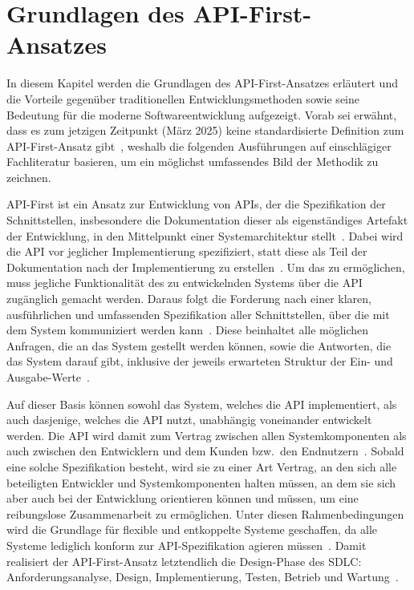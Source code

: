 \chapter{Grundlagen des API-First-Ansatzes}
In diesem Kapitel werden die Grundlagen des API-First-Ansatzes erläutert und die Vorteile gegenüber traditionellen Entwicklungsmethoden sowie seine Bedeutung für die moderne Softwareentwicklung aufgezeigt.
Vorab sei erwähnt, dass es zum jetzigen Zeitpunkt (März 2025) keine standardisierte Definition zum API-First-Ansatz gibt~\autocite[77]{bea22}, weshalb die folgenden Ausführungen auf einschlägiger Fachliteratur basieren, um ein möglichst umfassendes Bild der Methodik zu zeichnen.

API-First ist ein Ansatz zur Entwicklung von \acp{API}, der die Spezifikation der Schnittstellen, insbesondere die Dokumentation dieser als eigenständiges Artefakt der Entwicklung, in den Mittelpunkt einer Systemarchitektur stellt~\autocite[2]{kul23}.
Dabei wird die \ac{API} vor jeglicher Implementierung spezifiziert, statt diese als Teil der Dokumentation nach der Implementierung zu erstellen~\autocites[1627]{cha21}[349]{de23}.
Um das zu ermöglichen, muss jegliche Funktionalität des zu entwickelnden Systems über die \ac{API} zugänglich gemacht werden.
Daraus folgt die Forderung nach einer klaren, ausführlichen und umfassenden Spezifikation aller Schnittstellen, über die mit dem System kommuniziert werden kann~\autocite[75]{bea22}.
Diese beinhaltet alle möglichen Anfragen, die an das System gestellt werden können, sowie die Antworten, die das System darauf gibt, inklusive der jeweils erwarteten Struktur der Ein- und Ausgabe-Werte~\autocite[350]{de23}.

Auf dieser Basis können sowohl das System, welches die \ac{API} implementiert, als auch dasjenige, welches die \ac{API} nutzt, unabhängig voneinander entwickelt werden.
Die \ac{API} wird damit zum Vertrag zwischen allen Systemkomponenten als auch zwischen den Entwicklern und dem Kunden bzw.\ den Endnutzern~\autocite[1627]{cha21}.
Sobald eine solche Spezifikation besteht, wird sie zu einer Art Vertrag, an den sich alle beteiligten Entwickler und Systemkomponenten halten müssen, an dem sie sich aber auch bei der Entwicklung orientieren können und müssen, um eine reibungslose Zusammenarbeit zu ermöglichen.
Unter diesen Rahmenbedingungen wird die Grundlage für flexible und entkoppelte Systeme geschaffen, da alle Systeme lediglich konform zur \ac{API}-Spezifikation agieren müssen~\autocite[350,354,360]{de23}.
Damit realisiert der API-First-Ansatz letztendlich die Design-Phase des \ac{SDLC}: Anforderungsanalyse, Design, Implementierung, Testen, Betrieb und Wartung~\autocite{vol22}.

